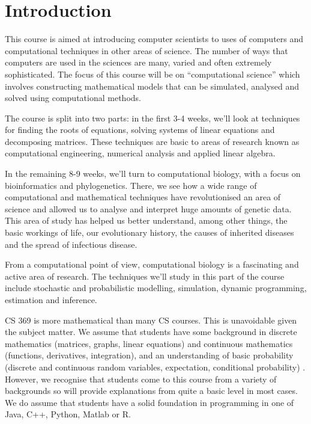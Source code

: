 \section{Introduction} \label{sec:intro}
This  course is aimed at introducing computer scientists to uses of computers and computational techniques in other areas of science.    The number of ways that computers are used in the sciences are many, varied and often extremely sophisticated.   The focus of this course will be  on  ``computational science'' which involves constructing mathematical models that can be simulated, analysed and solved using computational methods.  

The course is split into two parts:  in the first 3-4 weeks, we'll look at techniques for finding the roots of equations, solving systems of linear equations and decomposing matrices.  These techniques are basic to areas of research known as computational engineering, numerical analysis and applied linear algebra.  

In the remaining 8-9 weeks, we'll turn to computational biology, with a focus on bioinformatics and phylogenetics.  There, we see how a wide range of computational and mathematical techniques have revolutionised an area of science and allowed us to  analyse and interpret huge amounts of genetic data. This area of study has helped us better understand, among other things,  the basic workings of life,  our evolutionary  history, the causes of inherited diseases and the spread of infectious disease. 

From a computational point of view, computational biology is a fascinating and active area of research.  The techniques we'll study in this part of the course include stochastic and probabilistic modelling,  simulation, dynamic programming, estimation and inference.

CS 369 is more mathematical than many CS courses. This is unavoidable given the subject matter.   We assume that students have some background in discrete mathematics (matrices, graphs, linear equations) and continuous mathematics (functions, derivatives, integration), and an understanding of basic probability (discrete and continuous random variables, expectation, conditional probability) .    However, we recognise that students come to this course from a variety of  backgrounds so will provide explanations from quite a basic level in most cases.  We do assume that students have a solid foundation in programming in one of Java, C++, Python, Matlab or R.





